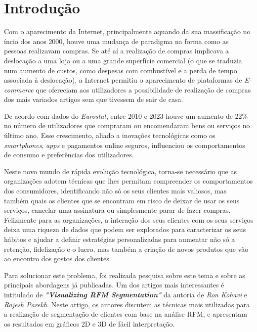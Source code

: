 \documentclass{easychair}
\begin{document}
\section{Introdução}
Com o aparecimento da Internet, principalmente aquando da sua massificação no íncio dos anos 2000, houve uma mudança de paradigma na forma como as pessoas realizavam compras. Se até aí a realização de compras implicava a deslocação a uma loja ou a uma grande superfície comercial (o que se traduzia num aumento de custos, como despesas com combustível e a perda de tempo associada à deslocação), a Internet permitiu o aparecimento de plataformas de \textit{E-commerce} que ofereciam aos utilizadores a possibilidade de realização de compras dos mais variados artigos sem que tivessem de sair de casa.

De acordo com dados do \textit{Eurostat}, entre 2010 e 2023 houve um aumento de 22\% no número de utilizadores que compraram ou encomendaram bens ou serviços no último ano\cite{eurostat}. Esse crescimento, aliado a inovações tecnológicas como os \textit{smartphones}, \textit{apps} e pagamentos online seguros, influenciou os comportamentos de consumo e preferências dos utilizadores.

Neste novo mundo de rápida evolução tecnológica, torna-se necessário que as organizações adotem técnicas que lhes permitam compreender os comportamentos dos consumidores, identificando não só os seus clientes mais valiosos, mas também quais os clientes que se encontram em risco de deixar de usar os seus serviços, cancelar uma assinatura ou simplesmente parar de fazer compras. Felizmente para as organizações, a interação dos seus clientes com os seus serviços deixa uma riqueza de dados que podem ser explorados para caracterizar os seus hábitos e ajudar a definir estratégias personalizadas para aumentar não só a retenção, fidelização e o lucro, mas também a criação de novos produtos que vão ao encontro dos gostos dos clientes.

Para solucionar este problema, foi realizada pesquisa sobre este tema e sobre as principais abordagens já publicadas. Um dos artigos mais interessantes é intitulado de \textit{\textbf{"Visualizing RFM Segmentation"}}\cite{RFMSDM2004} da autoria de \textit{Ron Kohavi} e \textit{Rajesh Parekh}. Neste artigo, os autores discutem as técnicas mais utilizadas para a realização de segmentação de clientes com base na análise RFM, e apresentam os resultados em gráficos 2D e 3D de fácil interpretação.
\end{document}
